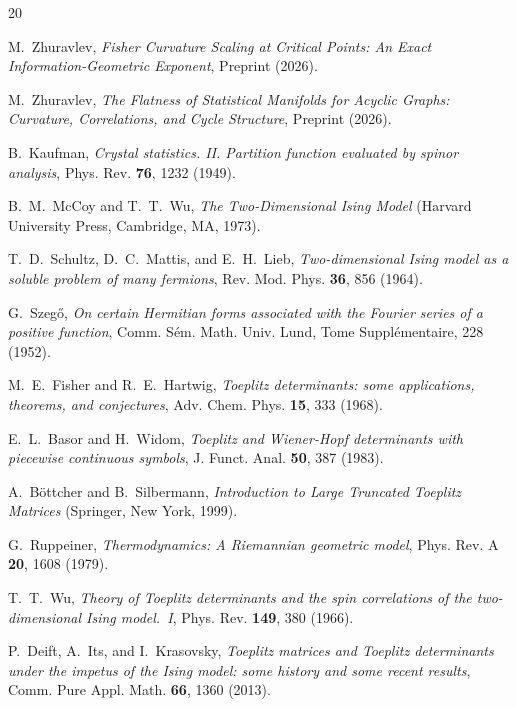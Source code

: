 \documentclass[11pt]{article}
\theoremstyle{definition}
\theoremstyle{remark}
\begin{document}
\begin{thebibliography}{20}

M.~Zhuravlev,
\textit{Fisher Curvature Scaling at Critical Points: An Exact
  Information-Geometric Exponent},
Preprint (2026).

M.~Zhuravlev,
\textit{The Flatness of Statistical Manifolds for Acyclic Graphs:
  Curvature, Correlations, and Cycle Structure},
Preprint (2026).

B.~Kaufman,
\textit{Crystal statistics. II. Partition function evaluated by spinor
  analysis},
Phys. Rev. \textbf{76}, 1232 (1949).

B.~M.~McCoy and T.~T.~Wu,
\textit{The Two-Dimensional Ising Model}
(Harvard University Press, Cambridge, MA, 1973).

T.~D.~Schultz, D.~C.~Mattis, and E.~H.~Lieb,
\textit{Two-dimensional Ising model as a soluble problem of many fermions},
Rev. Mod. Phys. \textbf{36}, 856 (1964).

G.~Szeg\H{o},
\textit{On certain Hermitian forms associated with the Fourier series
  of a positive function},
Comm. S\'em. Math. Univ. Lund, Tome Suppl\'ementaire, 228 (1952).

M.~E.~Fisher and R.~E.~Hartwig,
\textit{Toeplitz determinants: some applications, theorems, and
  conjectures},
Adv. Chem. Phys. \textbf{15}, 333 (1968).

E.~L.~Basor and H.~Widom,
\textit{Toeplitz and Wiener-Hopf determinants with piecewise continuous
  symbols},
J. Funct. Anal. \textbf{50}, 387 (1983).

A.~B\"ottcher and B.~Silbermann,
\textit{Introduction to Large Truncated Toeplitz Matrices}
(Springer, New York, 1999).

G.~Ruppeiner,
\textit{Thermodynamics: A Riemannian geometric model},
Phys. Rev. A \textbf{20}, 1608 (1979).

T.~T.~Wu,
\textit{Theory of Toeplitz determinants and the spin correlations of
  the two-dimensional Ising model.~I},
Phys. Rev. \textbf{149}, 380 (1966).

P.~Deift, A.~Its, and I.~Krasovsky,
\textit{Toeplitz matrices and Toeplitz determinants under the impetus
  of the Ising model: some history and some recent results},
Comm. Pure Appl. Math. \textbf{66}, 1360 (2013).


\end{thebibliography}
\end{document}
